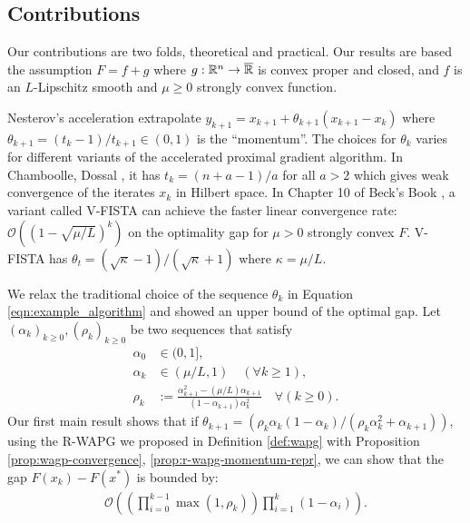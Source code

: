 \documentclass[12pt]{article}
\begin{document}
    \subsection{Contributions}
        Our contributions are two folds, theoretical and practical. 
        Our results are based the assumption $F = f + g$ where $g:\mathbb R^n \rightarrow \overline{\mathbb R}$ is convex proper and closed, and $f$ is an $L$-Lipschitz smooth and $\mu \ge 0$ strongly convex function. 
        \par
        Nesterov's acceleration extrapolate $y_{k + 1} = x_{k + 1} + \theta_{k + 1}(x_{k + 1} - x_k)$ where $\theta_{k + 1} = (t_{k} - 1)/t_{k + 1} \in (0, 1)$ is the ``momentum''. 
        The choices for $\theta_k$ varies for different variants of the accelerated proximal gradient algorithm. 
        In Chamboolle, Dossal \cite{chambolle_convergence_2015}, it has $t_k = (n + a - 1)/a$ for all $a > 2$ which gives weak convergence of the iterates $x_k$ in Hilbert space. 
        In Chapter 10 of Beck's Book \cite{beck_first-order_2017}, a variant called V-FISTA can achieve the faster linear convergence rate: $\mathcal O((1 - \sqrt{\mu/L})^k)$ on the optimality gap for $\mu > 0$ strongly convex $F$. 
        V-FISTA has $\theta_t = (\sqrt{\kappa} - 1)/(\sqrt{\kappa} + 1)$ where $\kappa = \mu/L$. 
        \par
        We relax the traditional choice of the sequence $\theta_k$ in Equation \ref{eqn:example_algorithm} and showed an upper bound of the optimal gap. 
        Let $(\alpha_k)_{k \ge0}, (\rho_k)_{k \ge 0}$ be two sequences that satisfy
        \begin{align*}
            \alpha_0 &\in (0, 1], 
            \\
            \alpha_k &\in (\mu/L, 1) \quad (\forall k \ge 1), 
            \\
            \rho_k &:= \frac{\alpha_{k + 1}^2 - (\mu/L)\alpha_{k + 1}}{(1 - \alpha_{k + 1})\alpha_k^2} \quad \forall (k \ge 0). 
        \end{align*}
        Our first main result shows that if $\theta_{k + 1} = (\rho_k\alpha_k(1 - \alpha_k)/(\rho_k\alpha_k^2 + \alpha_{k + 1}))$, using the R-WAPG we proposed in Definition \ref{def:wapg} with Proposition \ref{prop:wagp-convergence}, \ref{prop:r-wapg-momentum-repr}, we can show that the gap $F(x_k) - F(x^*)$ is bounded by:
        \begin{align*}
            \mathcal O\left(
                \left(
                    \prod_{i = 0}^{k - 1} \max(1, \rho_{k})
                \right)
                \prod_{i = 1}^{k} \left(1  - \alpha_i\right)
            \right). 
        \end{align*}
\end{document}
